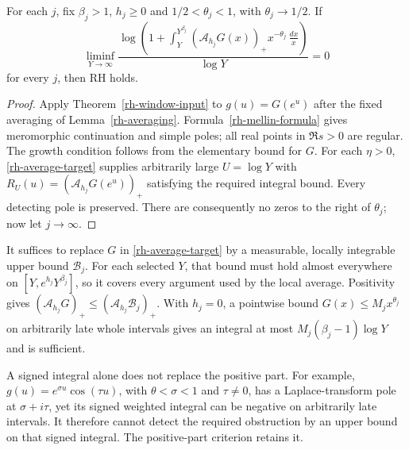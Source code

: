 \begin{corollary}
\label{rh-averaged}
For each $j$, fix $\beta_j>1$, $h_j\ge0$ and
$1/2<\theta_j<1$, with $\theta_j\to1/2$. If
\begin{equation}\label{rh-average-target}
 \liminf_{Y\to\infty}
 \frac{\log\left(1+\displaystyle\int_Y^{Y^{\beta_j}}
       (\mathcal A_{h_j}G(x))_+x^{-\theta_j}\,\frac{dx}{x}\right)}
      {\log Y}=0
\end{equation}
for every $j$, then RH holds.
\end{corollary}

\begin{proof}
Apply Theorem~\ref{rh-window-input} to $g(u)=G(e^u)$ after the fixed
averaging of Lemma~\ref{rh-averaging}. Formula~\eqref{rh-mellin-formula}
gives meromorphic continuation and simple poles; all real points in
$\Re s>0$ are regular. The growth condition follows from the elementary
bound for $G$. For each $\eta>0$, \eqref{rh-average-target} supplies
arbitrarily large $U=\log Y$ with
$R_U(u)=(\mathcal A_{h_j}G(e^u))_+$ satisfying the required integral
bound. Every detecting pole is preserved. There are consequently no
zeros to the right of $\theta_j$; now let $j\to\infty$.
\end{proof}

It suffices to replace $G$ in \eqref{rh-average-target} by a measurable,
locally integrable upper bound $\mathcal B_j$. For each selected $Y$,
that bound must hold almost everywhere on
$[Y,e^{h_j}Y^{\beta_j}]$, so it covers every argument used by the
local average. Positivity gives
$(\mathcal A_{h_j}G)_+\le(\mathcal A_{h_j}\mathcal B_j)_+$.
With $h_j=0$, a pointwise bound
$G(x)\le M_jx^{\theta_j}$ on arbitrarily late whole intervals gives
an integral at most $M_j(\beta_j-1)\log Y$ and is sufficient.

A signed integral alone does not replace the positive part. For
example, $g(u)=e^{\sigma u}\cos(\tau u)$, with $\theta<\sigma<1$ and
$\tau\ne0$, has a Laplace-transform pole at $\sigma+i\tau$, yet its
signed weighted integral can be negative on arbitrarily late intervals.
It therefore cannot detect the required obstruction by an upper bound
on that signed integral. The positive-part criterion retains it.


